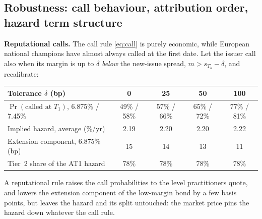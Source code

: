 \documentclass[11pt]{article}
\newcommand{\1}{\mathbf{1}}
\begin{document}
\subsection{Robustness: call behaviour, attribution order, hazard term structure}\label{sec:robust}
\textbf{Reputational calls.} The call rule \eqref{eq:call} is purely economic,
while European national champions have almost always called at the first date.
Let the issuer call also when its margin is up to $\delta$ \emph{below} the
new-issue spread, $m>s_{T_k}-\delta$, and recalibrate:
\begin{center}
\begin{tabular}{lcccc}
\toprule
Tolerance $\delta$ (bp) & 0 & 25 & 50 & 100 \\
\midrule
$\Pr(\text{called at }T_1)$, 6.875\% / 7.45\% & 49\% / 58\% & 57\% / 66\% & 65\% / 72\% & 77\% / 81\% \\
Implied hazard, average (\%/yr) & 2.19 & 2.20 & 2.20 & 2.22 \\
Extension component, 6.875\% (bp) & 15 & 14 & 13 & 11 \\
Tier~2 share of the AT1 hazard & 78\% & 78\% & 78\% & 78\% \\
\bottomrule
\end{tabular}
\end{center}
A reputational rule raises the call probabilities to the level practitioners
quote, and lowers the extension component of the low-margin bond by a few basis
points, but leaves the hazard and its split untouched: the market price pins the
hazard down whatever the call rule.
\end{document}
